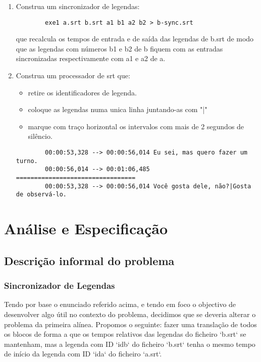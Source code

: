 \documentclass{report}
\begin{document}
\begin{enumerate}[1.]
    \item Construa um sincronizador de legendas:
        \begin{verbatim}
        exe1 a.srt b.srt a1 b1 a2 b2 > b-sync.srt
        \end{verbatim}
        que recalcula os tempos de entrada e de saída das legendas de b.srt de modo que as legendas com números b1 e b2 de b fiquem com as entradas sincronizadas respectivamente com a1 e a2 de a.

    \item Construa um processador de srt que:
        \begin{itemize}
            \item retire os identificadores de legenda.
            \item coloque as legendas numa unica linha juntando-as com "|"
            \item marque com traço horizontal os intervalos com mais de 2 segundos de silêncio.
        \end{itemize}
        \begin{verbatim}
        00:00:53,328 --> 00:00:56,014 Eu sei, mas quero fazer um turno.
        00:00:56,014 --> 00:01:06,485 =================================
        00:00:53,328 --> 00:00:56,014 Você gosta dele, não?|Gosta de observá-lo.
        \end{verbatim}
\end{enumerate}

\chapter{Análise e Especificação} \label{ae}

\section{Descrição informal do problema}

\subsection{Sincronizador de Legendas}


Tendo por base o enunciado referido acima, e tendo em foco o objectivo de desenvolver algo útil no contexto do problema, decidimos que se deveria alterar o problema da primeira alínea. Propomos o seguinte:
fazer uma translação de todos os blocos de forma a que os tempos relativos das legendas do ficheiro ‘b.srt‘ se mantenham, mas a legenda com ID ‘idb‘ do ficheiro ‘b.srt‘ tenha o mesmo tempo de início da legenda com ID ‘ida‘ do ficheiro ‘a.srt‘.
\end{document}
